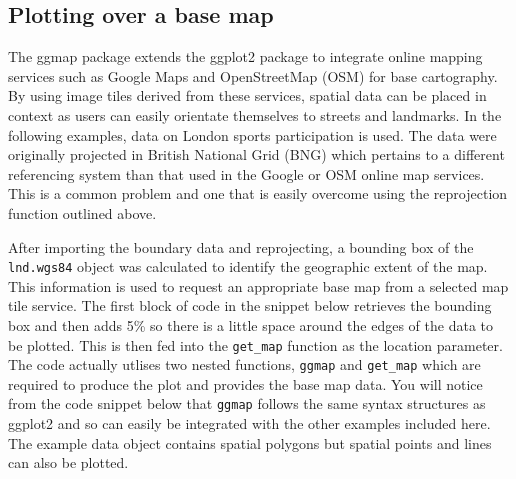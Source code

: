 \documentclass[]{article}
\newenvironment{Shaded}{}{}
\newcommand{\KeywordTok}[1]{\textcolor[rgb]{0.00,0.44,0.13}{\textbf{{#1}}}}
\newcommand{\DataTypeTok}[1]{\textcolor[rgb]{0.56,0.13,0.00}{{#1}}}
\newcommand{\DecValTok}[1]{\textcolor[rgb]{0.25,0.63,0.44}{{#1}}}
\newcommand{\FloatTok}[1]{\textcolor[rgb]{0.25,0.63,0.44}{{#1}}}
\newcommand{\CommentTok}[1]{\textcolor[rgb]{0.38,0.63,0.69}{\textit{{#1}}}}
\newcommand{\NormalTok}[1]{{#1}}
\begin{document}

\subsection{Plotting over a base map}

The ggmap package extends the ggplot2 package to integrate online mapping services such as Google Maps and OpenStreetMap (OSM) for base
cartography. By using image tiles derived from these services, spatial data can be placed
in context as users can easily orientate themselves to streets and
landmarks. In the following examples, data on London sports participation is used. The data
were originally projected in British National Grid (BNG) which pertains to a different referencing system
than that used in the Google or OSM  online map services. This is a common problem and one that is easily overcome using the reprojection function outlined above.

After importing the boundary data and reprojecting, a bounding box of the
\texttt{lnd.wgs84} object was calculated to identify the geographic extent of the map.
This information is used to request an appropriate base map from a selected
map tile service. The first block of code in the snippet below retrieves the
bounding box and then adds 5\% so there is a little space around the edges of the data to be plotted.
This is then fed into the \texttt{get\_map} function as the location
parameter. The code actually utlises two nested functions, \texttt{ggmap} and \texttt{get\_map} which are required to produce the plot and provides the base map data. You will notice from the code snippet below that \texttt{ggmap} follows the same syntax structures as ggplot2 and so can
easily be integrated with the other examples included here. The example data object contains spatial polygons but spatial points and lines can also be plotted.

\begin{Shaded}
\end{Shaded}
\begin{verbatim}
\end{verbatim}
\end{document}
